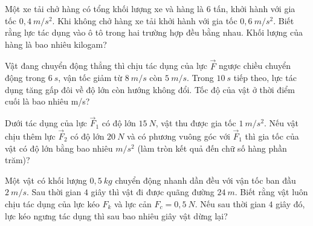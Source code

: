 \begin{ex}%
Một xe tải chở hàng có tổng khối lượng xe và hàng là $6$ tấn, khởi hành với gia tốc $0,4\ m/s^2$. Khi không chở hàng xe tải khởi hành với gia tốc $0,6\ m/s^2$. Biết rằng lực tác dụng vào ô tô trong hai trường hợp đều bằng nhau. Khối lượng của hàng là bao nhiêu kilogam?
\loigiai{}
\end{ex}
\begin{ex}%
Vật đang chuyển động thẳng thì chịu tác dụng của lực $\vec F$ ngược chiều chuyển động trong $6\ s$, vận tốc giảm từ $8\ m/s$ còn $5\ m/s$. Trong $10\ s$ tiếp theo, lực tác dụng tăng gấp đôi về độ lớn còn hướng không đổi. Tốc độ của vật ở thời điểm cuối là bao nhiêu m/s? 

 \end{ex}
\begin{ex}%
Dưới tác dụng của lực $\vec F_1$ có độ lớn $15\ N$, vật thu được gia tốc $1\ m/s^2$. Nếu vật chịu thêm lực $\vec F_2$ có độ lớn $20\ N$ và có phương vuông góc với $\vec{F}_1$ thì gia tốc của vật có độ lớn bằng bao nhiêu $m/s^2$ (làm tròn kết quả đến chữ số hàng phần trăm)?
 \end{ex}
\begin{ex}%
Một vật có khối lượng $0,5\ kg$ chuyển động nhanh dần đều với vận tốc ban đầu $2\ m/s$. Sau thời gian $4$ giây thì vật đi được quãng đường $24\ m$. Biết rằng vật luôn chịu tác dụng của lực kéo $F_k$
và lực cản $F_c=0,5\ N$. Nếu sau thời gian $4$ giây đó, lực kéo ngưng tác dụng thì sau bao nhiêu giây vật dừng lại?
\loigiai{}
\end{ex}






